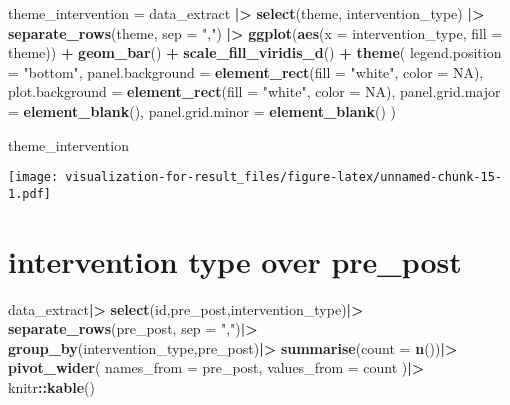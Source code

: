\documentclass[
]{article}
\newenvironment{Shaded}{\begin{snugshade}}{\end{snugshade}}
\newcommand{\AttributeTok}[1]{\textcolor[rgb]{0.13,0.29,0.53}{#1}}
\newcommand{\ConstantTok}[1]{\textcolor[rgb]{0.56,0.35,0.01}{#1}}
\newcommand{\FunctionTok}[1]{\textcolor[rgb]{0.13,0.29,0.53}{\textbf{#1}}}
\newcommand{\NormalTok}[1]{#1}
\newcommand{\OtherTok}[1]{\textcolor[rgb]{0.56,0.35,0.01}{#1}}
\newcommand{\SpecialCharTok}[1]{\textcolor[rgb]{0.81,0.36,0.00}{\textbf{#1}}}
\newcommand{\StringTok}[1]{\textcolor[rgb]{0.31,0.60,0.02}{#1}}
\begin{document}
\begin{Shaded}
\begin{Highlighting}[]
\NormalTok{theme\_intervention }\OtherTok{=}
\NormalTok{  data\_extract }\SpecialCharTok{|\textgreater{}}
    \FunctionTok{select}\NormalTok{(theme, intervention\_type) }\SpecialCharTok{|\textgreater{}}
    \FunctionTok{separate\_rows}\NormalTok{(theme, }\AttributeTok{sep =} \StringTok{","}\NormalTok{) }\SpecialCharTok{|\textgreater{}}
    \FunctionTok{ggplot}\NormalTok{(}\FunctionTok{aes}\NormalTok{(}\AttributeTok{x =}\NormalTok{ intervention\_type, }\AttributeTok{fill =}\NormalTok{ theme)) }\SpecialCharTok{+}
    \FunctionTok{geom\_bar}\NormalTok{() }\SpecialCharTok{+}
    \FunctionTok{scale\_fill\_viridis\_d}\NormalTok{() }\SpecialCharTok{+}
    \FunctionTok{theme}\NormalTok{(}
      \AttributeTok{legend.position =} \StringTok{"bottom"}\NormalTok{,}
      \AttributeTok{panel.background =} \FunctionTok{element\_rect}\NormalTok{(}\AttributeTok{fill =} \StringTok{"white"}\NormalTok{, }\AttributeTok{color =} \ConstantTok{NA}\NormalTok{),}
      \AttributeTok{plot.background =} \FunctionTok{element\_rect}\NormalTok{(}\AttributeTok{fill =} \StringTok{"white"}\NormalTok{, }\AttributeTok{color =} \ConstantTok{NA}\NormalTok{),}
      \AttributeTok{panel.grid.major =} \FunctionTok{element\_blank}\NormalTok{(),}
      \AttributeTok{panel.grid.minor =} \FunctionTok{element\_blank}\NormalTok{()}
\NormalTok{    )}

\NormalTok{theme\_intervention}
\end{Highlighting}
\end{Shaded}

\texttt{[image: visualization-for-result\_files/figure-latex/unnamed-chunk-15-1.pdf]}

\section{intervention type over
pre\_post}\label{intervention-type-over-pre_post}

\begin{Shaded}
\begin{Highlighting}[]
\NormalTok{data\_extract}\SpecialCharTok{|\textgreater{}}
  \FunctionTok{select}\NormalTok{(id,pre\_post,intervention\_type)}\SpecialCharTok{|\textgreater{}}
  \FunctionTok{separate\_rows}\NormalTok{(pre\_post, }\AttributeTok{sep =} \StringTok{","}\NormalTok{)}\SpecialCharTok{|\textgreater{}}
  \FunctionTok{group\_by}\NormalTok{(intervention\_type,pre\_post)}\SpecialCharTok{|\textgreater{}}
  \FunctionTok{summarise}\NormalTok{(}\AttributeTok{count =} \FunctionTok{n}\NormalTok{())}\SpecialCharTok{|\textgreater{}}
  \FunctionTok{pivot\_wider}\NormalTok{(}
    \AttributeTok{names\_from =}\NormalTok{ pre\_post,}
    \AttributeTok{values\_from =}\NormalTok{ count}
\NormalTok{  )}\SpecialCharTok{|\textgreater{}}
\NormalTok{  knitr}\SpecialCharTok{::}\FunctionTok{kable}\NormalTok{()}
\end{Highlighting}
\end{Shaded}
\end{document}
